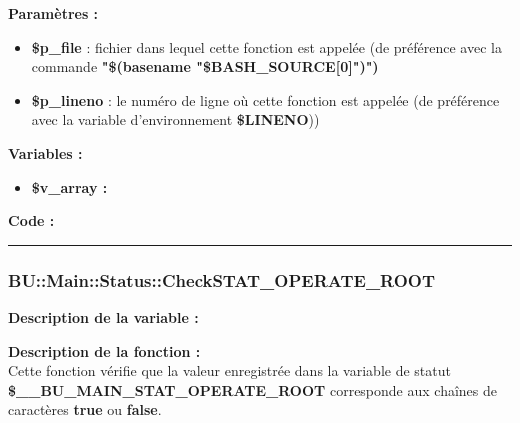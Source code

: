 \documentclass[a4paper,10pt]{article}
\begin{document}
\begin{justify}
    \textbf{Paramètres :}
    \begin{itemize}
        \item \color{orange}\textbf{\$p\_file}\color{white} : fichier dans lequel cette fonction est appelée (de préférence avec la commande \textbf{"\$(\color{gray}basename \color{white}"\color{orange}\$BASH\_SOURCE[0]\color{white}")")}\\

        \item \color{orange}\textbf{\$p\_lineno}\color{white} : le numéro de ligne où cette fonction est appelée (de préférence avec la variable d'environnement \textbf{\color{orange}\$LINENO}))
    \end{itemize}
\end{justify}

\begin{justify}
    \textbf{Variables :}

    \begin{itemize}
        \item \textbf{\color{orange}\$v\_array\color{white} :}
    \end{itemize}
\end{justify}

\begin{justify}
    \textbf{Code :}
\end{justify}



\color{blue}\par\noindent\rule{\textwidth}{0.4pt}\color{white}

\color{blue}
\subsubsection{\color{mauve}BU::Main::Status::CheckSTAT\_OPERATE\_ROOT}\color{white}

\begin{justify}
    \item \textbf{Description de la variable :}\\

\end{justify}

\begin{justify}
    \textbf{Description de la fonction :}\\
    Cette fonction vérifie que la valeur enregistrée dans la variable de statut\\ \textbf{\color{orange}\$\_\_BU\_MAIN\_STAT\_OPERATE\_ROOT} corresponde aux chaînes de caractères \textbf{true} ou \textbf{false}.
\end{justify}
\end{document}
